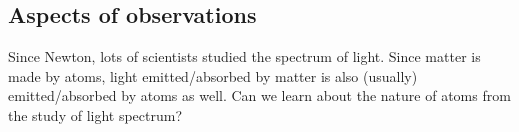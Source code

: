 \subsection{Aspects of observations}

Since Newton, lots of scientists studied the spectrum of light. Since matter is made by atoms, light emitted/absorbed by matter is also (usually) emitted/absorbed by atoms as well. Can we learn about the nature of atoms from the study of 
light spectrum?

